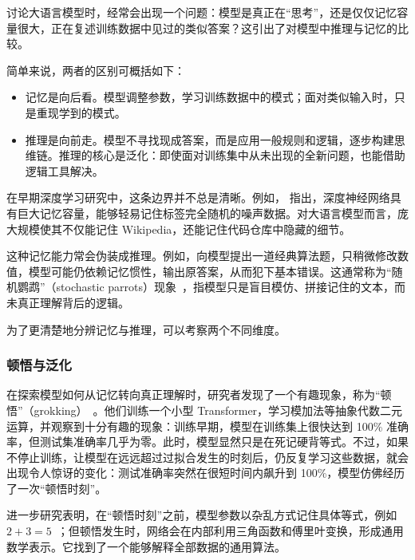 讨论大语言模型时，经常会出现一个问题：模型是真正在“思考”，还是仅仅记忆容量很大，正在复述训练数据中见过的类似答案？这引出了对模型中推理与记忆的比较。

简单来说，两者的区别可概括如下：

\begin{itemize}
\item \vspace{0.5cm} 记忆是向后看。模型调整参数，学习训练数据中的模式；面对类似输入时，只是重现学到的模式。
\item \vspace{0.3cm} 推理是向前走。模型不寻找现成答案，而是应用一般规则和逻辑，逐步构建思维链。推理的核心是泛化：即使面对训练集中从未出现的全新问题，也能借助逻辑工具解决。
\end{itemize}
\vspace{0.5cm}

在早期深度学习研究中，这条边界并不总是清晰。例如，\citet{zhang-etal:2021understand} 指出，深度神经网络具有巨大记忆容量，能够轻易记住标签完全随机的噪声数据。对大语言模型而言，庞大规模使其不仅能记住 Wikipedia，还能记住代码仓库中隐藏的细节。

这种记忆能力常会伪装成推理。例如，向模型提出一道经典算法题，只稍微修改数值，模型可能仍依赖记忆惯性，输出原答案，从而犯下基本错误。这通常称为“随机鹦鹉”（stochastic parrots）现象~\cite{bender-etal:2021dangers}，指模型只是盲目模仿、拼接记住的文本，而未真正理解背后的逻辑。

为了更清楚地分辨记忆与推理，可以考察两个不同维度。

\subsubsection{顿悟与泛化}

在探索模型如何从记忆转向真正理解时，研究者发现了一个有趣现象，称为“顿悟”（grokking）~\cite{power-etal:2022grokking}。他们训练一个小型 Transformer，学习模加法等抽象代数二元运算，并观察到十分有趣的现象：训练早期，模型在训练集上很快达到 100\% 准确率，但测试集准确率几乎为零。此时，模型显然只是在死记硬背等式。不过，如果不停止训练，让模型在远远超过过拟合发生的时刻后，仍反复学习这些数据，就会出现令人惊讶的变化：测试准确率突然在很短时间内飙升到 100\%，模型仿佛经历了一次“顿悟时刻”。


进一步研究表明，在“顿悟时刻”之前，模型参数以杂乱方式记住具体等式，例如 $2 + 3 = 5$~\cite{nanda-etal:2023progress}；但顿悟发生时，网络会在内部利用三角函数和傅里叶变换，形成通用数学表示。它找到了一个能够解释全部数据的通用算法。

